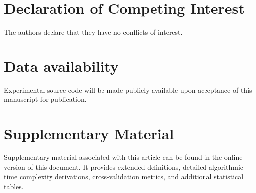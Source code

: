 \documentclass[authoryear,review,3p,times,12pt]{elsarticle}
\begin{document}
\section*{Declaration of Competing Interest}
The authors declare that they have no conflicts of interest.

\section*{Data availability}
Experimental source code will be made publicly available upon acceptance of this manuscript for publication.

\section*{Supplementary Material}
Supplementary material associated with this article can be found in the online version of this document. It provides extended definitions, detailed algorithmic time complexity derivations, cross-validation metrics, and additional statistical tables.

\newpage
\end{document}
